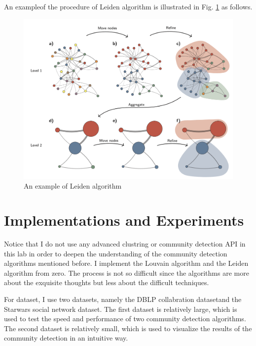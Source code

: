 \documentclass[12pt, a4paper]{article}
\theoremstyle{definition}
\begin{document}
An example\footnotemark[2] of the procedure of Leiden algorithm is illustrated in Fig. \ref{fig2} as follows.

\begin{figure}[htbp]
	\centering
	\includegraphics[width=4.7in]{2.png}
	\caption{An example of Leiden algorithm}
	\label{fig2}
\end{figure}

\section{Implementations and Experiments}
Notice that I do not use any advanced clustring or community detection API in this lab in order to deepen the understanding of the community detection algorithms mentioned before. I implement the Louvain algorithm and the Leiden algorithm from zero. The process is not so difficult since the algorithms are more about the exquisite thoughts but less about the difficult techniques.

For dataset, I use two datasets, namely the DBLP collabration dataset\footnotemark[4] and the Starwars social network dataset\footnotemark[5]. The first dataset is relatively large, which is used to test the speed and performance of two community detection algorithms. The second dataset is relatively small, which is used to visualize the results of the community detection in an intuitive way.

\end{document}
